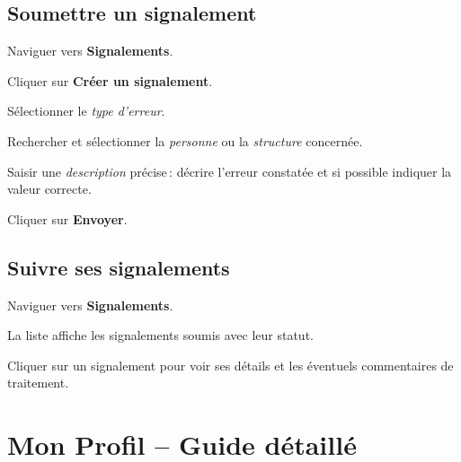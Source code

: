 \subsection{Soumettre un signalement}

\begin{steps}
  \item Naviguer vers \textbf{Signalements}.
  \item Cliquer sur \textbf{Cr\'eer un signalement}.
  \item S\'electionner le \textit{type d'erreur}.
  \item Rechercher et s\'electionner la \textit{personne} ou la \textit{structure} concern\'ee.
  \item Saisir une \textit{description} pr\'ecise\,: d\'ecrire l'erreur constat\'ee et si possible indiquer la valeur correcte.
  \item Cliquer sur \textbf{Envoyer}.
\end{steps}


\subsection{Suivre ses signalements}

\begin{steps}
  \item Naviguer vers \textbf{Signalements}.
  \item La liste affiche les signalements soumis avec leur statut.
  \item Cliquer sur un signalement pour voir ses d\'etails et les \'eventuels commentaires de traitement.
\end{steps}


\section{Mon Profil -- Guide d\'etaill\'e}
\label{sec:profil_detail}


